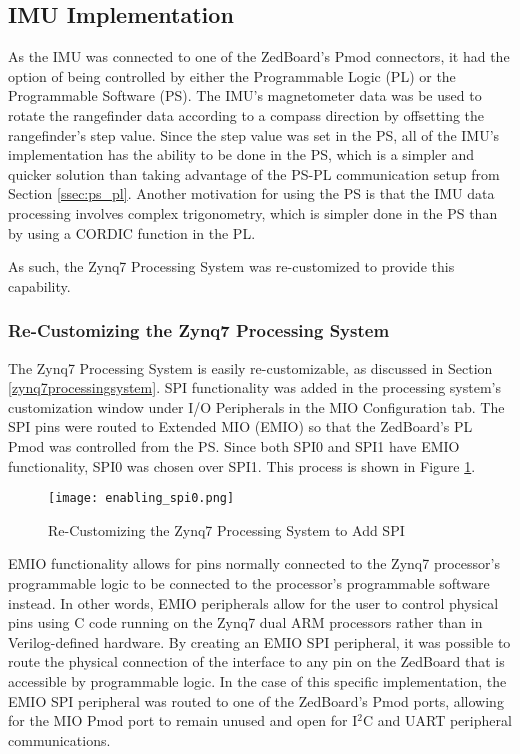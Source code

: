 \subsection{IMU Implementation}
As the IMU was connected to one of the ZedBoard's Pmod connectors, it had the option of being controlled by either the Programmable Logic (PL) or the Programmable Software (PS). The IMU's magnetometer data was be used to rotate the rangefinder data according to a compass direction by offsetting the rangefinder's step value. Since the step value was set in the PS, all of the IMU's implementation has the ability to be done in the PS, which is a simpler and quicker solution than taking advantage of the PS-PL communication setup from Section \ref{ssec:ps_pl}. Another motivation for using the PS is that the IMU data processing involves complex trigonometry, which is simpler done in the PS than by using a CORDIC function in the PL.
\par
As such, the Zynq7 Processing System was re-customized to provide this capability.

\subsubsection{Re-Customizing the Zynq7 Processing System}
The Zynq7 Processing System is easily re-customizable, as discussed in Section \ref{zynq7processingsystem}. SPI functionality was added in the processing system's customization window under I/O Peripherals in the MIO Configuration tab. The SPI pins were routed to Extended MIO (EMIO) so that the ZedBoard's PL Pmod was controlled from the PS. Since both SPI0 and SPI1 have EMIO functionality, SPI0 was chosen over SPI1. This process is shown in Figure \ref{enabling_spi0}.

\begin{figure}[H]
	\centerline{\texttt{[image: enabling\_spi0.png]}}
	\caption{Re-Customizing the Zynq7 Processing System to Add SPI}
	\label{enabling_spi0}
\end{figure}

\par
EMIO functionality allows for pins normally connected to the Zynq7 processor's programmable logic to be connected to the processor's programmable software instead. In other words, EMIO peripherals allow for the user to control physical pins using C code running on the Zynq7 dual ARM processors rather than in Verilog-defined hardware. By creating an EMIO SPI peripheral, it was possible to route the physical connection of the interface to any pin on the ZedBoard that is accessible by programmable logic. In the case of this specific implementation, the EMIO SPI peripheral was routed to one of the ZedBoard's Pmod ports, allowing for the MIO Pmod port to remain unused and open for I$^2$C and UART peripheral communications.






